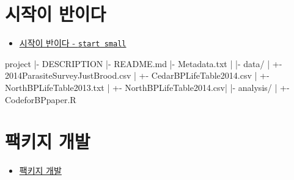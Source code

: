 \documentclass[
  letterpaper,
  chapter,a4paper,showtrims,openright,hidelinks]{oblivoir}
\newenvironment{Shaded}{\begin{snugshade}}{\end{snugshade}}
\newcommand{\ExtensionTok}[1]{\textcolor[rgb]{0.00,0.23,0.31}{#1}}
\newcommand{\KeywordTok}[1]{\textcolor[rgb]{0.00,0.23,0.31}{#1}}
\newcommand{\NormalTok}[1]{\textcolor[rgb]{0.00,0.23,0.31}{#1}}
\providecommand{\tightlist}{%
  \setlength{\itemsep}{0pt}\setlength{\parskip}{0pt}}\usepackage{longtable,booktabs,array}
\begin{document}
\hypertarget{start-small}{%
\section{시작이 반이다}\label{start-small}}

\begin{itemize}
\tightlist
\item
  \href{cd-start-small.html}{시작이 반이다 - \texttt{start\ small}}
\end{itemize}

\begin{Shaded}
\begin{Highlighting}[]
\ExtensionTok{project}
\KeywordTok{|}\ExtensionTok{{-}}\NormalTok{ DESCRIPTION}
\KeywordTok{|}\ExtensionTok{{-}}\NormalTok{ README.md  }
\KeywordTok{|}\ExtensionTok{{-}}\NormalTok{ Metadata.txt}
\KeywordTok{|}
\KeywordTok{|}\ExtensionTok{{-}}\NormalTok{ data/                }
\KeywordTok{|}   \ExtensionTok{+{-}}\NormalTok{ 2014ParasiteSurveyJustBrood.csv}
\KeywordTok{|}   \ExtensionTok{+{-}}\NormalTok{ CedarBPLifeTable2014.csv}
\KeywordTok{|}   \ExtensionTok{+{-}}\NormalTok{ NorthBPLifeTable2013.txt}
\KeywordTok{|}   \ExtensionTok{+{-}}\NormalTok{ NorthBPLifeTable2014.csv}\KeywordTok{|}
\KeywordTok{|}\ExtensionTok{{-}}\NormalTok{ analysis/}
\KeywordTok{|}   \ExtensionTok{+{-}}\NormalTok{ CodeforBPpaper.R}
\end{Highlighting}
\end{Shaded}

\hypertarget{pkg-development}{%
\section{팩키지 개발}\label{pkg-development}}

\begin{itemize}
\tightlist
\item
  \href{cd-pkg-development.html}{팩키지 개발}
\end{itemize}
\end{document}
